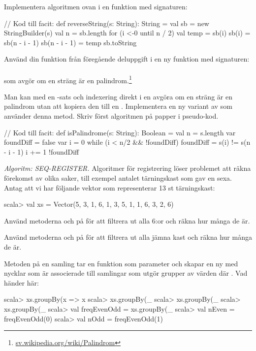 \Subtask Implementera algoritmen ovan i en funktion med signaturen: \\

\begin{Code}
// Kod till facit:
def reverseString(s: String): String = {
  val sb = new StringBuilder(s)
  val n = sb.length
  for (i <-0 until n / 2) { 
    val temp = sb(i)
    sb(i) = sb(n - i - 1)
    sb(n - i - 1) = temp
  }
  sb.toString     
}
\end{Code}

\Subtask Använd din funktion  från föregående deluppgift i en ny funktion med signaturen:\\
  \\ som avgör om en sträng är en palindrom.\footnote{\href{https://sv.wikipedia.org/wiki/Palindrom}{sv.wikipedia.org/wiki/Palindrom}} 

\Subtask\Pen Man kan med en -sats och indexering direkt i en  avgöra om en sträng är en palindrom utan att kopiera den till en . Implementera en ny variant av  som använder denna metod. Skriv först algoritmen på papper i pseudo-kod.

\begin{Code}
// Kod till facit:
def isPalindrome(s: String): Boolean = {
  val n = s.length
  var foundDiff = false
  var i = 0
  while (i < n/2 && !foundDiff)  { 
    foundDiff = s(i) != s(n - i - 1)
    i += 1
  }
  !foundDiff
}
\end{Code}

\Task \label{task:seq-reg} \emph{Algoritm: SEQ-REGISTER.} Algoritmer för registrering löser problemet att räkna förekomst av olika saker, till exempel antalet tärningskast som gav en sexa. Antag att vi har följande vektor  som representerar 13 st tärningskast:
\begin{REPL}
scala> val xs =  Vector(5, 3, 1, 6, 1, 3, 5, 1, 1, 6, 3, 2, 6)
\end{REPL}

\Subtask Använd metoderna  och  på  för att filtrera ut alla 6:or och räkna hur många de är.

\Subtask Använd metoderna  och  på  för att filtrera ut alla jämna kast och räkna hur många de är.

\Subtask Metoden  på en samling tar en funktion  som parameter och skapar en ny  med nycklar  som är associerade till samlingar som utgör grupper av värden där 
.  Vad händer här:
\begin{REPL}
scala> xs.groupBy(x => x %
scala> xs.groupBy(_ %
scala> xs.groupBy(_ %
scala> xs.groupBy(_ %
scala> val freqEvenOdd = xs.groupBy(_ %
scala> val nEven = freqEvenOdd(0)
scala> val nOdd = freqEvenOdd(1)
\end{REPL}

